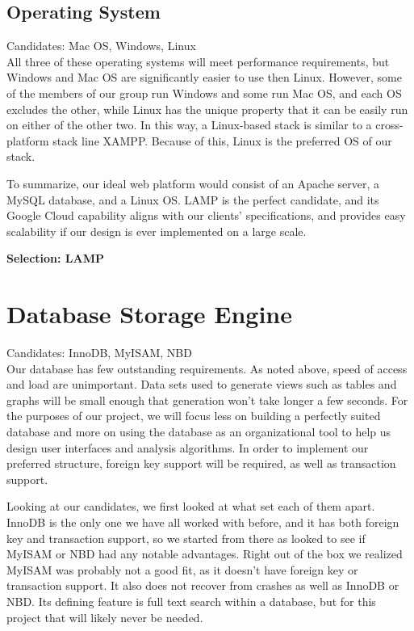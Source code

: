 \documentclass[letterpaper,10pt,titlepage]{article}
\begin{document}
\subsection{Operating System}

\normalsize Candidates: Mac OS, Windows, Linux
\\

\small All three of these operating systems will meet performance requirements, but Windows and Mac OS are significantly easier to use then Linux. However, some of the members of our group run Windows and some run Mac OS, and each OS excludes the other, while Linux has the unique property that it can be easily run on either of the other two. In this way, a Linux-based stack is similar to a cross-platform stack line XAMPP. Because of this, Linux is the preferred OS of our stack.

To summarize, our ideal web platform would consist of an Apache server, a MySQL database, and a Linux OS. LAMP is the perfect candidate, and its Google Cloud capability aligns with our clients' specifications, and provides easy scalability if our design is ever implemented on a large scale.  

\textbf{Selection: LAMP}


\section{Database Storage Engine}

\normalsize Candidates: InnoDB, MyISAM, NBD
\\

\small Our database has few outstanding requirements. As noted above, speed of access and load are unimportant. Data sets used to generate views such as tables and graphs will be small enough that generation won’t take longer a few seconds. For the purposes of our project, we will focus less on building a perfectly suited database and more on using the database as an organizational tool to help us design user interfaces and analysis algorithms. In order to implement our preferred structure, foreign key support will be required, as well as transaction support.

Looking at our candidates, we first looked at what set each of them apart. InnoDB is the only one we have all worked with before, and it has both foreign key and transaction support, so we started from there as looked to see if MyISAM or NBD had any notable advantages. Right out of the box we realized MyISAM was probably not a good fit, as it doesn’t have foreign key or transaction support. It also does not recover from crashes as well as InnoDB or NBD. Its defining feature is full text search within a database, but for this project that will likely never be needed.\cite{mysql}
\end{document}
